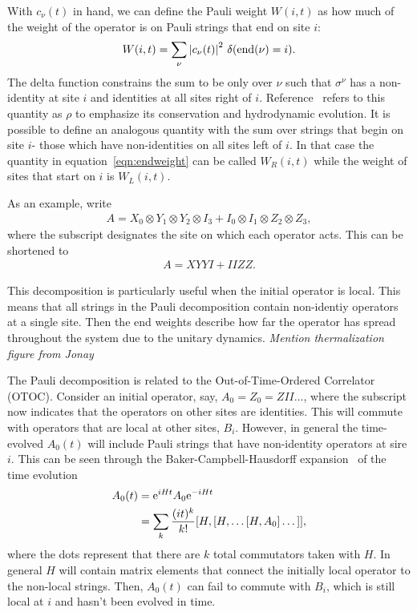 With $c_\nu(t)$ in hand, we can define the Pauli weight $W(i,t)$ as how much of the weight of the operator is on Pauli strings that end on site $i$:
\begin{align}
W(i,t) = \sum_\nu\left|c_\nu(t)\right|^2\,\delta(\text{end}(\nu)=i).
	\label{eqn:endweight}
\end{align}
The delta function constrains the sum to be only over $\nu$ such that $\sigma^\nu$ has a non-identity at site $i$ and identities at all sites right of $i$. Reference~\cite{Keyserlingk} refers to this quantity as $\rho$ to emphasize its conservation and hydrodynamic evolution. It is possible to define an analogous quantity with the sum over strings that begin on site $i$- those which have non-identities on all sites left of $i$. In that case the quantity in equation~\ref{eqn:endweight} can be called $W_R(i,t)$ while the weight of sites that start on $i$ is $W_L(i,t)$.

As an example, write
\begin{align}
A = X_0\otimes Y_1\otimes Y_2\otimes I_3 + I_0\otimes I_1\otimes Z_2\otimes Z_3,
	\nonumber
\end{align}
where the subscript designates the site on which each operator acts. This can be shortened to
\begin{align}
A = XYYI + IIZZ\label{eqn:inioper}.
\end{align}

This decomposition is particularly useful when the initial operator is local. This means that all strings in the Pauli decomposition contain non-identiy operators at a single site. Then the end weights describe how far the operator has spread throughout the system due to the unitary dynamics. \emph{Mention thermalization} \emph{figure from Jonay}

The Pauli decomposition is related to the Out-of-Time-Ordered Correlator (OTOC). Consider an initial operator, say, $A_0=Z_0=ZII\dots$, where the subscript now indicates that the operators on other sites are identities. This will commute with operators that are local at other sites, $B_i$. However, in general the time-evolved $A_0(t)$ will include Pauli strings that have non-identity operators at sire $i$. This can be seen through the Baker-Campbell-Hausdorff expansion~\cite{Roberts2016} of the time evolution
\begin{align}
A_0(t) &= \text{e}^{iHt}A_0\text{e}^{-iHt} \nonumber\\
&= \sum_k\frac{(it)^k}{k!}[H,[H,\dots[H,A_0]\dots]],\label{eqn:BCH}
\end{align}
where the dots represent that there are $k$ total commutators taken with $H$.
In general $H$ will contain matrix elements that connect the initially local operator to the non-local strings. Then, $A_0(t)$ can fail to commute with $B_i$, which is still local at $i$ and hasn't been evolved in time.


